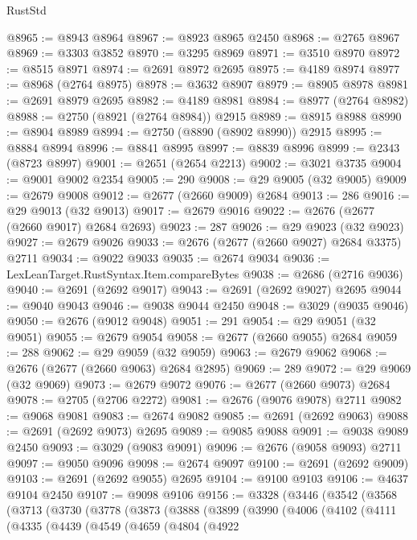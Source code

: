 \begin{lexlean}{RustStd}
\begin{coremodule}
@8965 := @8943 @8964
@8967 := @8923 @8965 @2450
@8968 := @2765 @8967
@8969 := @3303 @3852
@8970 := @3295 @8969
@8971 := @3510 @8970
@8972 := @8515 @8971
@8974 := @2691 @8972 @2695
@8975 := @4189 @8974
@8977 := @8968 (@2764 @8975)
@8978 := @3632 @8907
@8979 := @8905 @8978
@8981 := @2691 @8979 @2695
@8982 := @4189 @8981
@8984 := @8977 (@2764 @8982)
@8988 := @2750 (@8921 (@2764 @8984)) @2915
@8989 := @8915 @8988
@8990 := @8904 @8989
@8994 := @2750 (@8890 (@8902 @8990)) @2915
@8995 := @8884 @8994
@8996 := @8841 @8995
@8997 := @8839 @8996
@8999 := @2343 (@8723 @8997)
@9001 := @2651 (@2654 @2213)
@9002 := @3021 @3735
@9004 := @9001 @9002 @2354
@9005 := 290
@9008 := @29 @9005 (@32 @9005)
@9009 := @2679 @9008
@9012 := @2677 (@2660 @9009) @2684
@9013 := 286
@9016 := @29 @9013 (@32 @9013)
@9017 := @2679 @9016
@9022 := @2676 (@2677 (@2660 @9017) @2684 @2693)
@9023 := 287
@9026 := @29 @9023 (@32 @9023)
@9027 := @2679 @9026
@9033 := @2676 (@2677 (@2660 @9027) @2684 @3375) @2711
@9034 := @9022 @9033
@9035 := @2674 @9034
@9036 := LexLeanTarget.RustSyntax.Item.compareBytes
@9038 := @2686 (@2716 @9036)
@9040 := @2691 (@2692 @9017)
@9043 := @2691 (@2692 @9027) @2695
@9044 := @9040 @9043
@9046 := @9038 @9044 @2450
@9048 := @3029 (@9035 @9046)
@9050 := @2676 (@9012 @9048)
@9051 := 291
@9054 := @29 @9051 (@32 @9051)
@9055 := @2679 @9054
@9058 := @2677 (@2660 @9055) @2684
@9059 := 288
@9062 := @29 @9059 (@32 @9059)
@9063 := @2679 @9062
@9068 := @2676 (@2677 (@2660 @9063) @2684 @2895)
@9069 := 289
@9072 := @29 @9069 (@32 @9069)
@9073 := @2679 @9072
@9076 := @2677 (@2660 @9073) @2684
@9078 := @2705 (@2706 @2272)
@9081 := @2676 (@9076 @9078) @2711
@9082 := @9068 @9081
@9083 := @2674 @9082
@9085 := @2691 (@2692 @9063)
@9088 := @2691 (@2692 @9073) @2695
@9089 := @9085 @9088
@9091 := @9038 @9089 @2450
@9093 := @3029 (@9083 @9091)
@9096 := @2676 (@9058 @9093) @2711
@9097 := @9050 @9096
@9098 := @2674 @9097
@9100 := @2691 (@2692 @9009)
@9103 := @2691 (@2692 @9055) @2695
@9104 := @9100 @9103
@9106 := @4637 @9104 @2450
@9107 := @9098 @9106
@9156 := @3328
    (@3446
      (@3542
        (@3568
          (@3713
            (@3730
              (@3778
                (@3873
                  (@3888
                    (@3899
                      (@3990
                        (@4006
                          (@4102
                            (@4111
                              (@4335
                                (@4439
                                  (@4549
                                    (@4659
                                      (@4804
                                        (@4922

\end{coremodule}
\end{lexlean}
